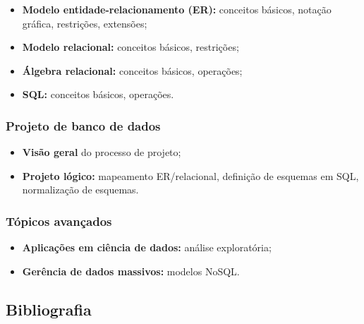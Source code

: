 \documentclass[12pt, a4paper]{article}
\begin{document}
\begin{itemize}\setlength{\itemsep}{0pt}
    \item \textbf{Modelo entidade-relacionamento (ER):} conceitos básicos, notação gráfica, restrições, extensões;
    \item \textbf{Modelo relacional:} conceitos básicos, restrições;
    \item \textbf{Álgebra relacional:} conceitos básicos, operações;
    \item \textbf{SQL:} conceitos básicos, operações.
\end{itemize}

\subsubsection*{Projeto de banco de dados} \label{subsubsec:projeto}

\begin{itemize}\setlength{\itemsep}{0pt}
    \item \textbf{Visão geral} do processo de projeto;
    \item \textbf{Projeto lógico:} mapeamento ER/relacional, definição de esquemas em SQL, normalização de esquemas.
\end{itemize}

\subsubsection*{Tópicos avançados} \label{subsubsec:topicos}

\begin{itemize}\setlength{\itemsep}{0pt}
    \item \textbf{Aplicações em ciência de dados:} análise exploratória;
    \item \textbf{Gerência de dados massivos:} modelos NoSQL.
\end{itemize}

\subsection{Bibliografia} \label{subsec:bibliografia}


\end{document}
